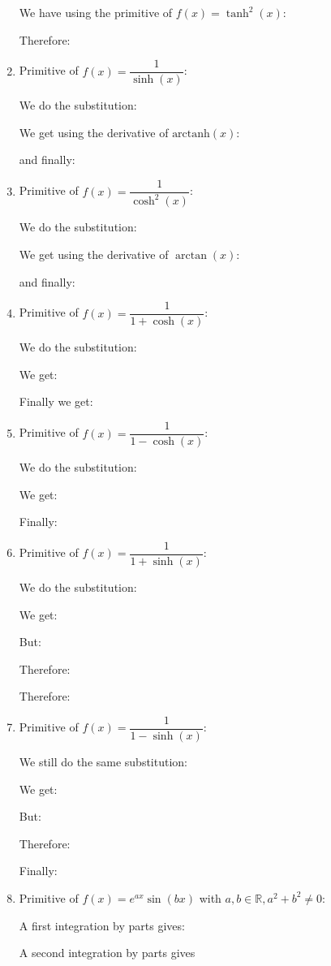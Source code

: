 \begin{enumerate}
		We have using the primitive of $f(x)=\tanh^2(x)$:
		
		Therefore:
		
		
		\item Primitive of $f(x)=\dfrac{1}{\sinh(x)}$:
		
		We do the substitution:
		
		We get using the derivative of $\text{arctanh}(x)$:
		
		
		and finally:
		
		
		\item Primitive of $f(x)=\dfrac{1}{\cosh^2(x)}$:
		
		We do the substitution:
		
		We get using the derivative of $\arctan(x)$:
		
		and finally:
		
		\item Primitive of $f(x)=\dfrac{1}{1+\cosh(x)}$:
		
		We do the substitution:
		
		We get:
		
		Finally we get:
		
		
		\item Primitive of $f(x)=\dfrac{1}{1-\cosh(x)}$:
		
		We do the substitution:
		
		We get:
		
		Finally:
		
		
		\item Primitive of $f(x)=\dfrac{1}{1+\sinh(x)}$:
		
		We do the substitution:
		
		We get:
		
		But:
		
		Therefore:
		
		Therefore:
		
		
		\item Primitive of $f(x)=\dfrac{1}{1-\sinh(x)}$:
		
		We still do the same substitution:
		
		We get:
		
		But:
		
		Therefore:
		
		Finally:
		
		
		\item Primitive of $f(x)=e^{ax}\sin(bx)$ with $a,b\in \mathbb{R},a^2+b^2\neq 0$:
		
		A first integration by parts gives:
		
		A second integration by parts gives
		

\end{enumerate}
